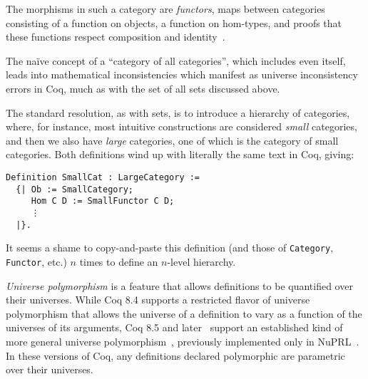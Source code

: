 The morphisms in such a category are \emph{functors},\label{sec:define-functor} maps between categories consisting of a function on objects, a function on hom-types, and proofs that these functions respect composition and identity~\cite{mac1998categories,awodey2010category,HoTTBook}.

The naïve concept of a ``category of all categories'',\label{sec:category-of-categories} which includes even itself, leads into mathematical inconsistencies which manifest as universe inconsistency errors in Coq, much as with the set of all sets discussed above.

The standard resolution, as with sets, is to introduce a hierarchy of categories, where, for instance, most intuitive constructions are considered \emph{small} categories, and then we also have \emph{large} categories, one of which is the category of small categories.
Both definitions wind up with literally the same text in Coq, giving:
\begin{verbatim}
Definition SmallCat : LargeCategory :=
  {| Ob := SmallCategory;
     Hom C D := SmallFunctor C D;
     ⋮
  |}.
\end{verbatim}

It seems a shame to copy-and-paste this definition (and those of \texttt{Category}, \texttt{Functor}, etc.) $n$ times to define an $n$-level hierarchy.

\emph{Universe polymorphism}\label{sec:universe-polymorphism-def} is a feature that allows definitions to be quantified over their universes.
While Coq 8.4 supports a restricted flavor of universe polymorphism that allows the universe of a definition to vary as a function of the universes of its arguments, Coq 8.5 and later~\cite{coq-commit-polyproj} support an established kind of more general universe polymorphism~\cite{Harper1991107}, previously implemented only in NuPRL~\cite{nuprl}.
In these versions of Coq, any definitions declared polymorphic are parametric over their universes.

